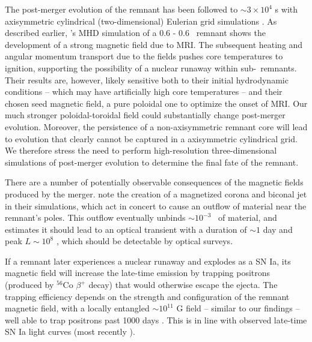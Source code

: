 The post-merger evolution of the remnant has been followed to $\sim3\times10^4$ s with axisymmetric cylindrical (two-dimensional) Eulerian grid simulations \citep{schw+12,ji+13}.  As described earlier, \cite{ji+13}'s MHD simulation of a 0.6 - 0.6 \Msun\ remnant shows the development of a strong magnetic field due to MRI.  The subsequent heating and angular momentum transport due to the fields pushes core temperatures to ignition, supporting the possibility of a nuclear runaway within sub-\Mch\ remnants.  Their results are, however, likely sensitive both to their initial hydrodynamic conditions -- which may have artificially high core temperatures -- and their chosen seed magnetic field, a pure poloidal one to optimize the onset of MRI.  Our much stronger poloidal-toroidal field could substantially change post-merger evolution.  Moreover, the persistence of a non-axisymmetric remnant core will lead to evolution that clearly cannot be captured in a axisymmetric cylindrical grid.  We therefore stress the need to perform high-resolution three-dimensional simulations of post-merger evolution to determine the final fate of the remnant.


There are a number of potentially observable consequences of the magnetic fields produced by the merger.  \cite{ji+13} note the creation of a magnetized corona and biconal jet in their simulations, which act in concert to cause an outflow of material near the remnant's poles.  This outflow eventually unbinds $\sim10^{-3}$ \Msun\ of material, and \cite{belo14} estimates it should lead to an optical transient with a duration of $\sim1$ day and peak $L \sim10^{8}$ \Lsun, which should be detectable by optical surveys.

If a remnant later experiences a nuclear runaway and explodes as a SN Ia, its magnetic field will increase the late-time emission by trapping positrons (produced by $^{56}$Co $\beta^+$ decay) that would otherwise escape the ejecta.  The trapping efficiency depends on the strength and configuration of the remnant magnetic field, with a locally entangled $\sim10^{11}$ G field -- similar to our findings -- well able to trap positrons past 1000 days \citep{ruizs98}.  This is in line with observed late-time SN Ia light curves (most recently \citealt{kerz+14}).

